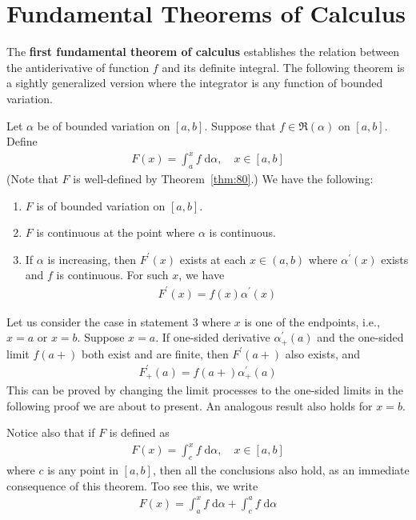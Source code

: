 \documentclass[thmcnt=section, 12pt]{my-elegantbook}
\begin{document}

\section{Fundamental Theorems of Calculus}


The \textbf{first fundamental theorem of calculus}
establishes the relation between the antiderivative of function $f$
and its definite integral.
The following theorem is a sightly generalized version
where the integrator is any function of bounded variation.

\begin{theorem} \label{thm:79}
	Let $\alpha$ be of bounded variation on $[a, b]$.
	Suppose that $f \in \mathfrak{R}(\alpha)$ on $[a, b]$.
	Define
	\begin{align*}
		F(x) = \int_a^x f \; \mathrm{d} \alpha,
		\quad x \in [a, b]
	\end{align*}
	(Note that $F$ is well-defined by Theorem~\ref{thm:80}.)
	We have the following:
	\begin{enumerate}
		\item $F$ is of bounded variation on $[a, b]$.
		\item $F$ is continuous at the point where $\alpha$ is continuous.
		\item If $\alpha$ is increasing, 
			then $F^\prime(x)$ exists at each $x \in (a, b)$
			where $\alpha^\prime(x)$ exists 
			and $f$ is continuous. For such $x$, we have 
			\begin{align*}
				F^\prime(x) = f(x) \alpha^\prime(x)
			\end{align*}
	\end{enumerate}
\end{theorem}

\begin{note}
	Let us consider the case in statement 3 
	where $x$ is one of the endpoints, 
	i.e., $x = a$ or $x = b$.
	Suppose $x = a$.
	If one-sided derivative $\alpha^\prime_{+}(a)$
	and the one-sided limit $f(a+)$ both exist and are finite,
	then $F^\prime(a+)$ also exists, and
	\begin{align*}
		F^\prime_{+}(a) = f(a+) \alpha^\prime_{+}(a)
	\end{align*}
	This can be proved by changing the limit processes
	to the one-sided limits in the following proof
	we are about to present.
	An analogous result also holds for $x = b$. 

	Notice also that if $F$ is defined as 
	\begin{align*}
		F(x) = \int_c^x f \; \mathrm{d} \alpha, 
		\quad x \in [a, b]
	\end{align*}
	where $c$ is any point in $[a, b]$,
	then all the conclusions also hold, 
	as an immediate consequence of this theorem.
	Too see this, we write
	\begin{align*}
		F(x) = \int_a^x f \; \mathrm{d} \alpha
		+ \int_c^a f \; \mathrm{d} \alpha
	\end{align*}
\end{note}
\end{document}
